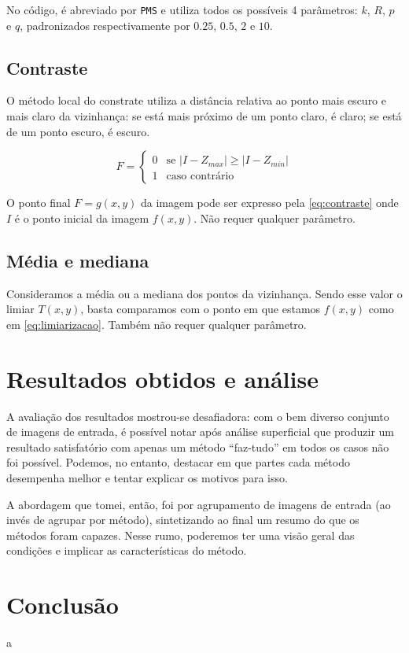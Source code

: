 \documentclass[brazilian,a4paper,twocolumn]{article}
\begin{document}
        No código, é abreviado por \texttt{PMS} e utiliza todos os possíveis 4 parâmetros: $k$, $R$, $p$ e $q$, padronizados respectivamente por $0.25$, $0.5$, $2$ e $10$.

    \subsection{Contraste}

        O método local do constrate utiliza a distância relativa ao ponto mais escuro e mais claro da vizinhança: se está mais próximo de um ponto claro, é claro; se está de um ponto escuro, é escuro.

        \begin{equation}
        \label{eq:contraste}
            F =
            \begin{cases}
                0       & \text{se $\mathopen|I - Z_{max}\mathclose| \geq \mathopen|I - Z_{min}\mathclose|$} \\
                1       & \text{caso contrário}
            \end{cases}
        \end{equation}

        O ponto final $F = g(x, y)$ da imagem pode ser expresso pela \cref{eq:contraste} onde $I$ é o ponto inicial da imagem $f(x, y)$. Não requer qualquer parâmetro.

    \subsection{Média e mediana}

        Consideramos a média ou a mediana dos pontos da vizinhança. Sendo esse valor o limiar $T(x, y)$, basta comparamos com o ponto em que estamos $f(x, y)$ como em \cref{eq:limiarizacao}. Também não requer qualquer parâmetro.


\section{Resultados obtidos e análise}

    A avaliação dos resultados mostrou-se desafiadora: com o bem diverso conjunto de imagens de entrada, é possível notar após análise superficial que produzir um resultado satisfatório com apenas um método ``faz-tudo'' em todos os casos não foi possível. Podemos, no entanto, destacar em que partes cada método desempenha melhor e tentar explicar os motivos para isso.

    A abordagem que tomei, então, foi por agrupamento de imagens de entrada (ao invés de agrupar por método), sintetizando ao final um resumo do que os métodos foram capazes. Nesse rumo, poderemos ter uma visão geral das condições e implicar as características do método.


\section{Conclusão}

    a
\end{document}
